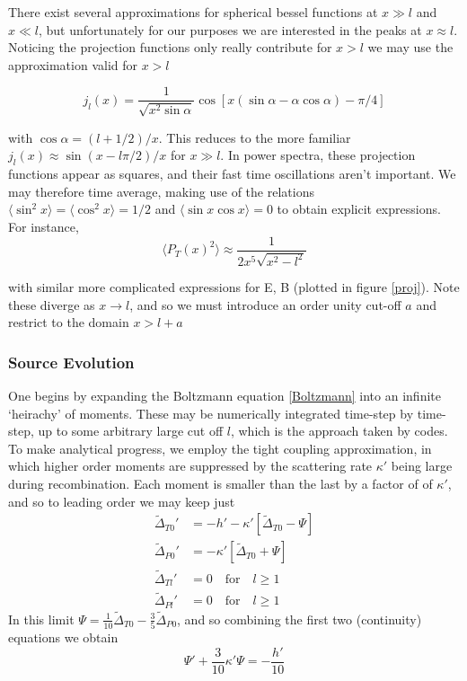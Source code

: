 \documentclass[a4paper,10pt]{article}
\begin{document}
There exist several approximations for spherical bessel functions at $x\gg l$ and $x\ll l$, but unfortunately for our purposes we are interested in the peaks at $x\approx l$. Noticing the projection functions only really contribute for $x>l$ we may use the approximation valid for $x>l$

\begin{equation}
j_l(x) = \frac{1}{\sqrt{x^2\sin\alpha}}\cos[x(\sin\alpha-\alpha\cos\alpha)-\pi/4]
\end{equation}

with $\cos\alpha=(l+1/2)/x$. This reduces to the more familiar $j_l(x) \approx \sin(x-l\pi/2)/x$ for $x\gg l$. In power spectra, these projection functions appear as squares, and their fast time oscillations aren't important. We may therefore time average, making use of the relations $\langle \sin^2x \rangle = \langle \cos^2x \rangle = 1/2$ and $\langle \sin x\cos x \rangle = 0$ to obtain explicit expressions. For instance,
\begin{equation}
\langle P_T(x)^2 \rangle \approx \frac{1}{2x^5\sqrt{x^2-l^2}}
\end{equation}

with similar more complicated expressions for E, B (plotted in figure \ref{proj}). Note these diverge as $x\rightarrow l$, and so we must introduce an order unity cut-off $a$ and restrict to the domain $x>l+a$





\subsubsection{Source Evolution}

One begins by expanding the Boltzmann equation \ref{Boltzmann} into an infinite `heirachy' of moments. These may be numerically integrated time-step by time-step, up to some arbitrary large cut off $l$, which is the approach taken by codes. To make analytical progress, we employ the tight coupling approximation, in which higher order moments are suppressed by the scattering rate $\kappa'$ being large during recombination. Each moment is smaller than the last by a factor of of $\kappa'$, and so to leading order we may keep just	
\begin{equation}
\begin{split}
\tilde{\Delta}_{T0}'&=-h'-\kappa'[\tilde{\Delta}_{T0}-\Psi]\\
\tilde{\Delta}_{P0}'&=-\kappa'[\tilde{\Delta}_{T0}+\Psi]\\
\tilde{\Delta}_{Tl}'&=0\quad\text{for} \quad l\geq1\\
\tilde{\Delta}_{Pl}'&=0\quad\text{for} \quad l\geq1
\end{split}
\end{equation}
In this limit $\Psi = \frac{1}{10}\tilde{\Delta}_{T0} - \frac{3}{5}\tilde{\Delta}_{P0}$, and so combining the first two (continuity) equations we obtain
\begin{equation}
\Psi ' +\frac{3}{10}\kappa'\Psi = -\frac{h'}{10}
\end{equation}
\end{document}
